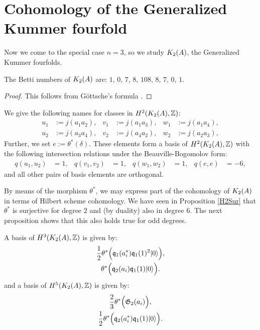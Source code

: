 \section{Cohomology of the Generalized Kummer fourfold}
Now we come to the special case $n=3$, so we study $\kum{A}{2}$, the Generalized Kummer fourfolds.
\begin{proposition}
The Betti numbers of $\kum{A}{2}$ are:
$
1,\,0,\,7,\,8,\,108,\,8,\,7,\,0,\,1.
$
\end{proposition}
\begin{proof}
This follows from G\"ottsche's formula \cite[page 49]{Gottsche}.
\end{proof}


\begin{notation} We give the following names for classes in $H^2(\kum{A}{2},\Z)$:
\begin{align*}
u_1 &:= j(a_1 a_2), & v_1 &:= j(a_1 a_3), & w_1 &:= j(a_1 a_4), \\ 
u_2 &:= j(a_3 a_4), & v_2 &:= j(a_4 a_2), & w_2 &:= j(a_2 a_3),
\end{align*}
Further, we set $e:=\theta^*(\delta)$.
These elements form a basis of $H^2(\kum{A}{2},\Z)$ with the following intersection relations under the Beauville-Bogomolov form:
\begin{align*}
q(u_1,u_2) &= 1, & q(v_1,v_2) &= 1, & q(w_1,w_2) &= 1,  &
q(e,e)&= -6,
\end{align*}
and all other pairs of basis elements are orthogonal.
\end{notation}
By means of the morphism $\theta^*$, we may express part of the cohomology of $\kum{A}{2}$ in terms of Hilbert scheme cohomology. We have seen in Proposition \ref{H2Sur} that $\theta^*$ is surjective for degree $2$ and (by duality) also in degree $6$. 
The next proposition shows that this also holds true for odd degrees.
\begin{proposition}
A basis of $H^3(\X,\Z)$ is given by:
\begin{gather}
\label{A3_1}
\frac{1}{2}\theta^*\Big( \q_1(a^*_i)\q_1(1)^2\vac \Big), \\
\label{A3_2}
\theta^*\Big(\q_2(a_i)\q_1(1)\vac\Big).
\end{gather}
and a basis of $H^5(\X,\Z)$ is given by:
\begin{gather}
\label{A5_1}
\frac{2}{3} \theta^*\Big( \G_2(a_i) \Big), \\
\label{A5_2}
\frac{1}{2}\theta^*\Big( \q_2(a^*_i)\q_1(1)\vac \Big).
\end{gather}
\end{proposition}
